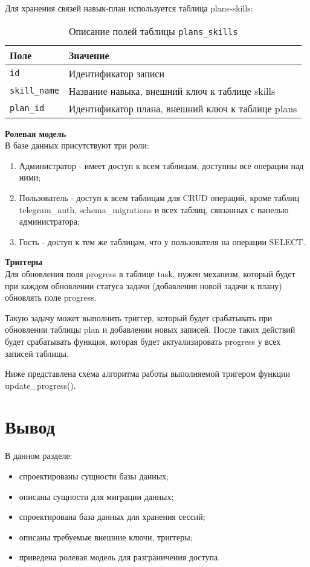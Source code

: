 Для хранения связей навык-план используется таблица plans-skills:
\begin{table}[!ht]
    \caption{Описание полей таблицы \texttt{plans\_skills}}
    \label{tbl:plans-skills}
    \begin{center}
        \begin{tabular}{|p{}p{}|}
            \hline
            \textbf{Поле} & \textbf{Значение} \\\hline
            \texttt{id} & Идентификатор записи \\\hline
            \texttt{skill\_name} & Название навыка, внешний ключ к таблице skills \\\hline
            \texttt{plan\_id} & Идентификатор плана, внешний ключ к таблице plans \\\hline
        \end{tabular}
    \end{center}
\end{table}

\newpage
\noindent\textbf{Ролевая модель}\\
В базе данных присутствуют три роли:
\begin{enumerate}
\item Администратор - имеет доступ к всем таблицам, доступны все операции над ними;
\item Пользователь - доступ к всем таблицам для CRUD операций, кроме таблиц telegram\_auth, schema\_migrations и всех таблиц, сявзанных с панелью администратора;
\item Гость - доступ к тем же таблицам, что у пользователя на операции SELECT.
\end{enumerate}

\noindent\textbf{Триггеры}\\
Для обновления поля progress в таблице task, нужен механизм, который будет при каждом обновлении статуса задачи (добавления новой задачи к плану) обновлять поле progress.

Такую задачу может выполнить триггер, который будет срабатывать при обновлении таблицы plan и добавлении новых записей. После таких действий будет срабатывать функция, которая будет актуализировать progress у всех записей таблицы.  

Ниже представлена схема алгоритма работы выполняемой тригером функции update\_progress().


\newpage
\section*{Вывод}
В данном разделе:
\begin{itemize}
\item спроектированы сущности базы данных;
\item описаны сущности для миграции данных;
\item спроектирована база данных для хранения сессий;
\item описаны требуемые внешние ключи, триггеры;
\item приведена ролевая модель для разграничения доступа.
\end{itemize}